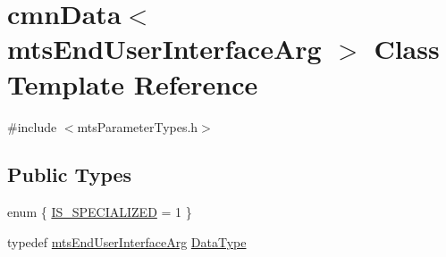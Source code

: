 \hypertarget{classcmn_data_3_01mts_end_user_interface_arg_01_4}{\section{cmn\-Data$<$ mts\-End\-User\-Interface\-Arg $>$ Class Template Reference}
\label{classcmn_data_3_01mts_end_user_interface_arg_01_4}
}


{\ttfamily \#include $<$mts\-Parameter\-Types.\-h$>$}

\subsection*{Public Types}
\begin{DoxyCompactItemize}
\item 
enum \{ \hyperlink{classcmn_data_3_01mts_end_user_interface_arg_01_4_a4e45c72ef21e076e17b51e2c510d8195a405e54b42dfa3b3aed15fdfcdc9b73dd}{I\-S\-\_\-\-S\-P\-E\-C\-I\-A\-L\-I\-Z\-E\-D} = 1
 \}
\item 
typedef \hyperlink{classmts_end_user_interface_arg}{mts\-End\-User\-Interface\-Arg} \hyperlink{classcmn_data_3_01mts_end_user_interface_arg_01_4_aedf4f6543ddf0d9a93eeb4825c17a9e8}{Data\-Type}
\end{DoxyCompactItemize}
